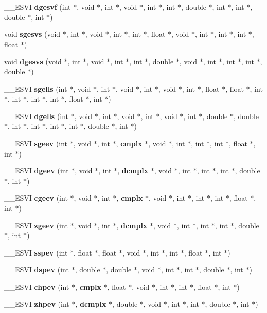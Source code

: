 \begin{CompactItemize}
\_\-\_\-ESVI {\bf dgesvf} (int $\ast$, void $\ast$, int $\ast$, void $\ast$, int $\ast$, int $\ast$, double $\ast$, int $\ast$, int $\ast$, double $\ast$, int $\ast$)
\item 
void {\bf sgesvs} (void $\ast$, int $\ast$, void $\ast$, int $\ast$, int $\ast$, float $\ast$, void $\ast$, int $\ast$, int $\ast$, int $\ast$, float $\ast$)
\item 
void {\bf dgesvs} (void $\ast$, int $\ast$, void $\ast$, int $\ast$, int $\ast$, double $\ast$, void $\ast$, int $\ast$, int $\ast$, int $\ast$, double $\ast$)
\item 
\_\-\_\-ESVI {\bf sgells} (int $\ast$, void $\ast$, int $\ast$, void $\ast$, int $\ast$, void $\ast$, int $\ast$, float $\ast$, float $\ast$, int $\ast$, int $\ast$, int $\ast$, int $\ast$, float $\ast$, int $\ast$)
\item 
\_\-\_\-ESVI {\bf dgells} (int $\ast$, void $\ast$, int $\ast$, void $\ast$, int $\ast$, void $\ast$, int $\ast$, double $\ast$, double $\ast$, int $\ast$, int $\ast$, int $\ast$, int $\ast$, double $\ast$, int $\ast$)
\item 
\_\-\_\-ESVI {\bf sgeev} (int $\ast$, void $\ast$, int $\ast$, {\bf cmplx} $\ast$, void $\ast$, int $\ast$, int $\ast$, int $\ast$, float $\ast$, int $\ast$)
\item 
\_\-\_\-ESVI {\bf dgeev} (int $\ast$, void $\ast$, int $\ast$, {\bf dcmplx} $\ast$, void $\ast$, int $\ast$, int $\ast$, int $\ast$, double $\ast$, int $\ast$)
\item 
\_\-\_\-ESVI {\bf cgeev} (int $\ast$, void $\ast$, int $\ast$, {\bf cmplx} $\ast$, void $\ast$, int $\ast$, int $\ast$, int $\ast$, float $\ast$, int $\ast$)
\item 
\_\-\_\-ESVI {\bf zgeev} (int $\ast$, void $\ast$, int $\ast$, {\bf dcmplx} $\ast$, void $\ast$, int $\ast$, int $\ast$, int $\ast$, double $\ast$, int $\ast$)
\item 
\_\-\_\-ESVI {\bf sspev} (int $\ast$, float $\ast$, float $\ast$, void $\ast$, int $\ast$, int $\ast$, float $\ast$, int $\ast$)
\item 
\_\-\_\-ESVI {\bf dspev} (int $\ast$, double $\ast$, double $\ast$, void $\ast$, int $\ast$, int $\ast$, double $\ast$, int $\ast$)
\item 
\_\-\_\-ESVI {\bf chpev} (int $\ast$, {\bf cmplx} $\ast$, float $\ast$, void $\ast$, int $\ast$, int $\ast$, float $\ast$, int $\ast$)
\item 
\_\-\_\-ESVI {\bf zhpev} (int $\ast$, {\bf dcmplx} $\ast$, double $\ast$, void $\ast$, int $\ast$, int $\ast$, double $\ast$, int $\ast$)

\end{CompactItemize}

